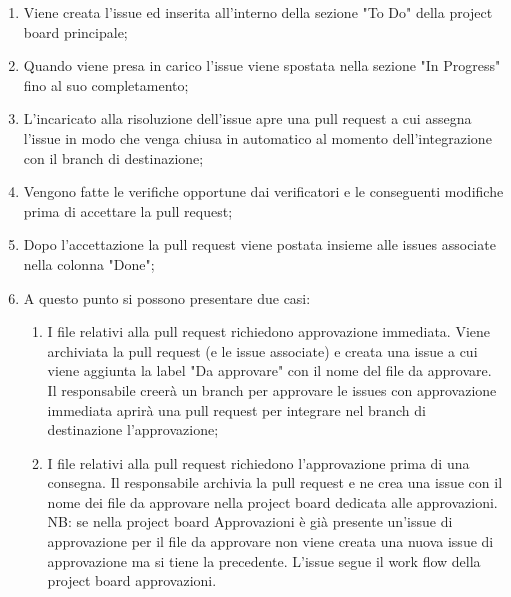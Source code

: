 \begin{enumerate}
	\item Viene creata l'issue ed inserita all'interno della sezione "To Do" della project board principale;
	\item Quando viene presa in carico l'issue viene spostata nella sezione "In Progress" fino al suo completamento;
	\item L'incaricato alla risoluzione dell'issue apre una pull request a cui assegna l'issue in modo che  venga chiusa in automatico al momento dell'integrazione con il branch di destinazione;
	\item Vengono fatte le verifiche opportune dai verificatori e le conseguenti modifiche prima di accettare la pull request;
	\item Dopo l'accettazione la pull request viene postata insieme alle issues associate nella colonna "Done";
	\item A questo punto si possono presentare due casi: 
	\begin{enumerate}
		\item I file relativi alla pull request richiedono approvazione immediata.
		Viene archiviata la pull request (e le issue associate) e creata una issue a cui viene aggiunta la label "Da approvare" con il nome del file da approvare.
		Il responsabile creerà un branch per approvare le issues con approvazione immediata aprirà una pull request per integrare nel branch di destinazione l'approvazione;
		\item I file relativi alla pull request richiedono l'approvazione prima di una consegna.
		Il responsabile archivia la pull request e ne crea una issue con il nome dei file da approvare nella project board dedicata alle approvazioni.
		NB: se nella project board Approvazioni è già presente un'issue di approvazione per il file da approvare non viene creata una nuova issue di approvazione ma si tiene la precedente.
		L'issue segue il work flow della project board approvazioni.
	\end{enumerate}
\end{enumerate}

